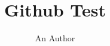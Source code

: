 \documentclass[11pt]{book}
\title{Github Test}
\author{An Author}
\begin{document}
\maketitle
\def\title#1{\chapter{#1}}
\tableofcontents

        
        
        
        
        
        
        
        
        
        
\end{document}
